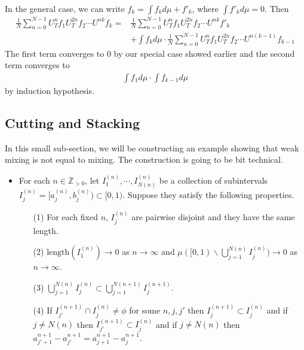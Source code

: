\documentclass[12pt,a4paper]{report}
\newenvironment{proof}
{\begin{changemargin}{1cm}{0.5cm} 
	}%
	{\end{changemargin}
}
\begin{document}
\begin{proof}
\quad In the general case, we can write $f_k = \int f_k d\mu + f'_{k}$, where $\int f'_k d\mu =0$. Then
\begin{align*}
\frac{1}{N} \sum_{n=0}^{N-1}  U_T^n f_1 U^{2n}_T f_2 \cdots U^{nk} f_k =& \frac{1}{N} \sum_{n=0}^{N-1}  U_T^n f_1 U^{2n}_T f_2 \cdots U^{nk} f'_k \\
& + \int f_{k} d\mu \cdot \frac{1}{N} \sum_{n=0}^{N-1}  U_T^n f_1 U^{2n}_T f_2 \cdots U^{n(k-1)} f_{k-1}
\end{align*}
The first term converges to 0 by our special case showed earlier and the second term converges to
\begin{align*}
\int f_1 d\mu \cdot \int f_{k-1} d\mu
\end{align*}
by induction hypothesis.

\eop
\end{proof}
\s

\subsection*{Cutting and Stacking}

In this small sub-section, we will be constructing an example showing that weak mixing is not equal to mixing. The construction is going to be bit technical.
\begin{itemize}
\item For each $n\in \mathbb{Z}_{>0}$, let $I_1^{(n)}, \cdots, I_{N(n)}^{(n)}$ be a collection of subintervals $I_j^{(n)} = [a_j^{(n)}, b_j^{(n)} ) \subset [0,1)$. Suppose they satisfy the following properties.
\begin{itemize}
\item[(1)] For each fixed $n$, $I_j^{(n)}$ are pairwise disjoint and they have the same length.
\item[(2)] $\text{length}(I_1^{(n)}) \rightarrow 0$ as $n\rightarrow \infty$ and $\mu([0,1) \backslash \bigcup_{j=1}^{N(n)} I_j^{(n)}) \rightarrow 0$ as $n\rightarrow \infty$.
\item[(3)] $\bigcup_{j=1}^{N(n)} I_j^{(n)} \subset \bigcup_{j=1}^{N(n+1)} I^{(n+1)}_j$.
\item[(4)] If $I_{j'}^{(n+1)} \cap I_j^{(n)} \neq \phi$ for some $n,j,j'$ then $I_j^{(n+1)} \subset I_j^{(n)}$ and if $j \neq N(n)$ then $I_{j'}^{(n+1)} \subset I_j^{(n)}$ and if $j \neq N(n)$ then $a^{n+1}_{j'+1} - a^{n+1}_{j'} = a^{n+1}_{j+1} - a^{n+1}_{j}$. 
\end{itemize}
\end{itemize}
\s
\end{document}
